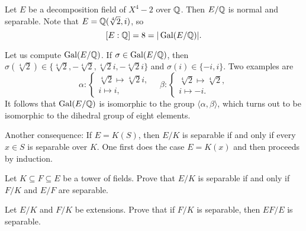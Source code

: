 \begin{example}
    Let $E$ be a decomposition field of $X^4-2$ over $\mathbb{Q}$. 
    Then $E/\mathbb{Q}$ is normal and separable. Note that
    $E=\mathbb{Q}(\sqrt[4]{2},i)$, so 
    \[
    [E:\mathbb{Q}]=8=|\operatorname{Gal}(E/\mathbb{Q})|.
    \]
    
    Let us compute
    $\operatorname{Gal}(E/\mathbb{Q})$. If $\sigma\in\operatorname{Gal}(E/\mathbb{Q})$, then 
    $\sigma(\sqrt[4]{2})\in\{\sqrt[4]{2},-\sqrt[4]{2},\sqrt[4]{2}i,-\sqrt[4]{2}i\}$ and 
    $\sigma(i)\in\{-i,i\}$. Two examples are 
    \[
    \alpha\colon\begin{cases}
    \sqrt[4]{2}\mapsto\sqrt[4]{2}i,\\
    i\mapsto i,
    \end{cases}
    \quad
    \beta\colon\begin{cases}
    \sqrt[4]{2}\mapsto\sqrt[4]{2},\\
    i\mapsto -i.
    \end{cases}
    \]
    It follows that 
    $\operatorname{Gal}(E/\mathbb{Q})$ is isomorphic to the group $\langle\alpha,\beta\rangle$, which turns out to be
    isomorphic to the dihedral group
    of eight elements. 
\end{example}


Another consequence: If $E=K(S)$, then $E/K$ is separable if and only if
every $x\in S$ is separable over $K$. One first does the case $E=K(x)$ 
and then proceeds by induction. 

\begin{exercise}
\label{xca:separable1}
    Let $K\subseteq F\subseteq E$ be a tower of fields. Prove that 
    $E/K$ is separable if and only if $F/K$ and $E/F$ are separable. 
\end{exercise}



\begin{exercise}
\label{xca:separable2}
    Let $E/K$ and $F/K$ be extensions. Prove that if $F/K$ is separable, 
    then $EF/E$ is separable. 
\end{exercise}

